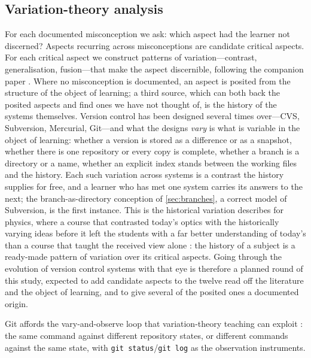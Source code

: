 \subsection{Variation-theory analysis}
\label{sec:method-vt-analysis}

For each documented misconception we ask: which aspect had the learner not
discerned?
Aspects recurring across misconceptions are candidate critical aspects.
For each critical aspect we construct patterns of variation---contrast,
generalisation, fusion---that make the aspect discernible, following the
companion paper \autocite{VTProgMisconceptions}.
Where no misconception is documented, an aspect is posited from the
structure of the object of learning; a third source, which can both back
the posited aspects and find ones we have not thought of, is the history
of the systems themselves.
Version control has been designed several times over---CVS, Subversion,
Mercurial, Git---and what the designs \emph{vary} is what is variable in
the object of learning: whether a version is stored as a difference or
as a snapshot, whether there is one repository or every copy is
complete, whether a branch is a directory or a name, whether an explicit
index stands between the working files and the history.
Each such variation across systems is a contrast the history supplies
for free, and a learner who has met one system carries its answers to
the next; the branch-as-directory conception of \cref{sec:branches}, a
correct model of Subversion, is the first instance.
This is the historical variation \citeauthor{NCOL} describes for
physics, where a course that contrasted today's optics with the
historically varying ideas before it left the students with a far better
understanding of today's than a course that taught the received view
alone \autocite[p.~58]{NCOL}: the history of a subject is a ready-made
pattern of variation over its critical aspects.
Going through the evolution of version control systems with that eye is
therefore a planned round of this study, expected to add candidate
aspects to the twelve read off the literature and the object of
learning, and to give several of the posited ones a documented origin.

Git affords the vary-and-observe loop that variation-theory teaching can
exploit \autocite{Svensson2020Affordances,ThuneEckerdal2009Variation,
ThuneEckerdal2018Lab}: the same command against different repository
states, or different commands against the same state, with
\texttt{git status}/\texttt{git log} as the observation instruments.

